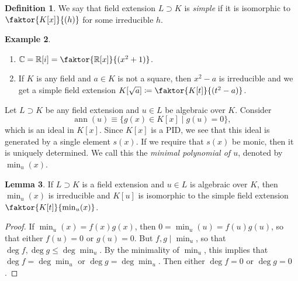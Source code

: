 \documentclass[10pt,letterpaper,cm]{nupset}
\theoremstyle{definition}
\newtheorem{definition}{Definition}[subsection]
\newtheorem{exmp}[definition]{Example}
\theoremstyle{theorem}
\newtheorem{lemma}[definition]{Lemma}
\theoremstyle{remark}
\newcommand{\C}{\mathbb C}
\newcommand{\R}{\mathbb R}
\newcommand{\1}{\mathbf{1}}
\newcommand{\0}{\vec 0}
\DeclareMathOperator{\ann}{ann}
\begin{document}
\begin{definition}
We say that field extension $L \supset K$ is \textit{simple} if it is isomorphic to $\faktor{K[x]}{(h)}$ for some irreducible $h$.
\end{definition}

\begin{exmp} $ $
\begin{enumerate}
\item $\C = \R[i] = \faktor{\R[x]}{(x^2 +1)}$.
\item If $K$ is any field and $a\in K$ is not a square, then $x^2 -a$ is irreducible and we get a simple field extension $K[\sqrt{a}] \coloneqq \faktor{K[t]}{(t^2 -a)}$.
\end{enumerate}
\end{exmp}

\smallskip

Let $L \supset K$ be any field extension and $u\in L$ be algebraic over $K$. Consider $$\ann(u) \equiv  \{g(x) \in K[x] \mid g(u) =0\},$$ which is an ideal in $K[x]$. Since $K[x]$ is a PID, we see that this ideal is generated by a single element $s(x)$. If we require that $s(x)$ be monic, then it is uniquely determined. We call this the \textit{minimal polynomial of $u$}, denoted by $\min_u(x)$. 


\begin{lemma}\label{LL}
If $L \supset K$ is a field extension and $u\in L$ is algebraic over $K$, then $\min_u(x)$ is irreducible and $K[u]$ is isomorphic to the simple field extension $\faktor{K[t]}{\min_u(x)}$.
\end{lemma}
\begin{proof}
If $\min_u(x) = f(x)g(x)$, then $0 = \min_u(u) = f(u) g(u)$, so that either $f(u) = 0$ or $g(u) =0$. But $f,g \mid \min_u$, so that $\deg{f}, \deg{g} \leq \deg{\min_u}$. By the minimality of $\min_u$, this implies that $\deg{f} = \deg{\min_u}$ or $\deg{g} = \deg{\min_u}$. Then either $\deg{f} =0$ or $\deg{g} =0$. 
\end{proof}
\end{document}
